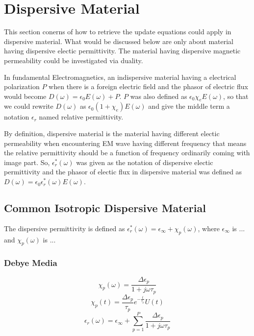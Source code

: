\section{Dispersive Material}
This section conerns of how to retrieve the update equations could apply in dispersive material. What would be discussed
below are only about material having dispersive electic permittivity. The material having dispersive magnetic
permeability could be investigated via duality.

In fundamental Electromagnetics, an indispersive material having a electrical polarization $P$ when there is a foreign
electric field and the phasor of electric flux would become $D(\omega) = \epsilon_0 E(\omega) + P$. $P$ was also defined
as $\epsilon_0 \chi_e E(\omega)$, so that we could rewrite $D(\omega)$ as $\epsilon_0 (1+\chi_e)E(\omega)$ and give the middle term a notation
$\epsilon_r$ named relative permittivity.

By definition, dispersive material is the material having different electic permeability when encountering EM wave
having different frequency that means the relative permittivity should be a function of frequency ordinarily coming with
image part. So, $\epsilon_r^*(\omega)$ was given as the notation of dispersive electic permittivity and the phasor of
electic flux in dispersive material was defined as $D(\omega) = \epsilon_0 \epsilon_r^*(\omega)E(\omega)$.
\subsection{Common Isotropic Dispersive Material}
The dispersive permittivity is defined as $\epsilon_r^*(\omega) = \epsilon_{\infty} + \chi_p(\omega)$, where
$\epsilon_{\infty}$ is ... and $\chi_p(\omega)$ is ...

\subsubsection{Debye Media}
\begin{equation}
  \chi_p(\omega) = \frac{\Delta\epsilon_p}{1+j\omega\tau_p}  
\end{equation}
\begin{equation}
  \chi_p(t) = \frac{\Delta \epsilon_p}{\tau_p} e^{-\frac{t}{\tau_p}}U(t)  
\end{equation}
\begin{equation}
  \epsilon_r(\omega) = \epsilon_{\infty} + \sum_{p=1}^P \frac{\Delta\epsilon_p}{1+j\omega\tau_p}  
\end{equation}



